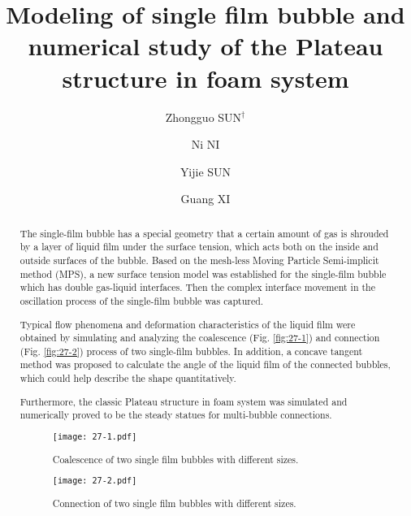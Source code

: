 \documentclass[10pt]{article}
\title{Modeling of single film bubble and numerical study of the Plateau structure in foam system}
\date{}
\author[$\relax$]{Zhongguo SUN$^\dagger$}
\author[$\relax$]{Ni NI}
\author[$\relax$]{Yijie SUN}
\author[$\relax$]{Guang XI}
\affil[$\relax$]{School of Energy and Power Engineering, Xian Jiaotong University, China}
\affil[$\relax$]{\email{\dagger}{sun.zg@xjtu.edu.cn}}
\begin{document}
\maketitle


\begin{abstract}
The single-film bubble has a special geometry that a certain amount of gas is shrouded by a layer of liquid film under the surface tension, which acts both on the inside and outside surfaces of the bubble. Based on the mesh-less Moving Particle Semi-implicit method (MPS), a new surface tension model was established for the single-film bubble which has double gas-liquid interfaces. Then the complex interface movement in the oscillation process of the single-film bubble was captured.

Typical flow phenomena and deformation characteristics of the liquid film were obtained by simulating and analyzing the coalescence (Fig. \ref{fig:27-1}) and connection (Fig. \ref{fig:27-2}) process of two single-film bubbles. In addition, a concave tangent method was proposed to calculate the angle of the liquid film of the connected bubbles, which could help describe the shape quantitatively.

Furthermore, the classic Plateau structure in foam system was simulated and numerically proved to be the steady statues for multi-bubble connections.

\begin{figure}[!htb]
\centering
\texttt{[image: 27-1.pdf]}
\caption{Coalescence of two single film bubbles with different sizes.}\label{fig:27-1}
\end{figure}

\begin{figure}[!htb]
\centering
\texttt{[image: 27-2.pdf]}
\caption{Connection of two single film bubbles with different sizes.}\label{fig:27-2}
\end{figure}

\end{abstract}



\addbib
\end{document}
